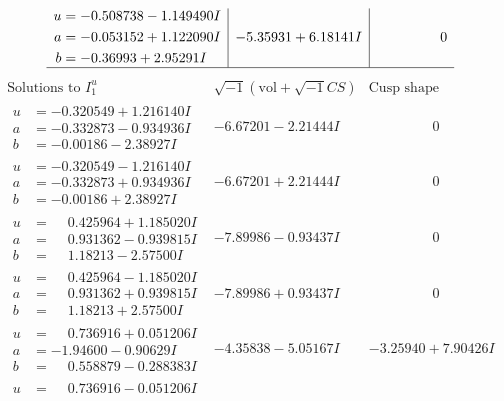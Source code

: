 \documentclass[1p]{elsarticle_modified}
\theoremstyle{definition}
\newcommand{\I}{\sqrt{-1}}
\begin{document}
$$\begin{array}{c|c|c}
\begin{aligned}
u &= -0.508738 - 1.149490 I \\
a &= -0.053152 + 1.122090 I \\
b &= -0.36993 + 2.95291 I\end{aligned}
 & -5.35931 + 6.18141 I & \phantom{-0.000000 } 0\\
 \hline 
 \end{array}$$\newpage$$\begin{array}{c|c|c}  
\text{Solutions to }I^u_{1}& \I (\text{vol} + \sqrt{-1}CS) & \text{Cusp shape}\\
 \hline 
\begin{aligned}
u &= -0.320549 + 1.216140 I \\
a &= -0.332873 - 0.934936 I \\
b &= -0.00186 - 2.38927 I\end{aligned}
 & -6.67201 - 2.21444 I & \phantom{-0.000000 } 0 \\ \hline\begin{aligned}
u &= -0.320549 - 1.216140 I \\
a &= -0.332873 + 0.934936 I \\
b &= -0.00186 + 2.38927 I\end{aligned}
 & -6.67201 + 2.21444 I & \phantom{-0.000000 } 0 \\ \hline\begin{aligned}
u &= \phantom{-}0.425964 + 1.185020 I \\
a &= \phantom{-}0.931362 - 0.939815 I \\
b &= \phantom{-}1.18213 - 2.57500 I\end{aligned}
 & -7.89986 - 0.93437 I & \phantom{-0.000000 } 0 \\ \hline\begin{aligned}
u &= \phantom{-}0.425964 - 1.185020 I \\
a &= \phantom{-}0.931362 + 0.939815 I \\
b &= \phantom{-}1.18213 + 2.57500 I\end{aligned}
 & -7.89986 + 0.93437 I & \phantom{-0.000000 } 0 \\ \hline\begin{aligned}
u &= \phantom{-}0.736916 + 0.051206 I \\
a &= -1.94600 - 0.90629 I \\
b &= \phantom{-}0.558879 - 0.288383 I\end{aligned}
 & -4.35838 - 5.05167 I & -3.25940 + 7.90426 I \\ \hline\begin{aligned}
u &= \phantom{-}0.736916 - 0.051206 I \\

\end{aligned}
\end{array}$$
\end{document}

